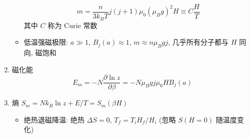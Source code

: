 \documentclass[12pt,a4paper]{article}%
\numberwithin{equation}{section}
\begin{document}
\begin{enumerate}
\begin{itemize}
\begin{equation}
            m = \frac n{3k_BT} j(j+1)\mu_0(\mu_B g)^2H
            \equiv C\frac HT
        \end{equation}
        其中 $C$ 称为 Curie 常数
        \item 低温强磁极限: $a\gg 1$, 
        $B_j(a)\approx 1$, $m\approx n\mu_B gj$, 
        几乎所有分子都与 $H$ 同向, 磁饱和
    \end{itemize}
    \item 磁化能
    \begin{equation}
        E_m = -N \frac{\partial\ln z}{\partial\beta} = -N\mu_B gj\mu_0 HB_j(a)
    \end{equation}
    \item 熵 $S_m = Nk_B\ln z + E/T = S_m(\beta H)$
    \begin{itemize}
        \item 绝热退磁降温: 绝热 $\Delta S = 0$, $T_f = T_i H_f/H_i$
        (忽略 $S(H=0)$ 随温度变化)
    \end{itemize}
\end{enumerate}
\end{document}
